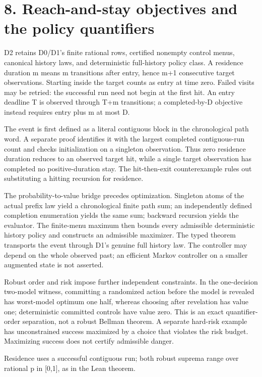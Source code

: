 \documentclass[11pt,a4paper]{article}
\newcommand{\companionEquation}[1]{\begin{center}\sbox{\companionEqBox}{$\displaystyle #1$}\ifdim\wd\companionEqBox>\linewidth\resizebox{\linewidth}{!}{\usebox{\companionEqBox}}\else\usebox{\companionEqBox}\fi\end{center}}
\begin{document}
\section{8. Reach-and-stay objectives and the policy quantifiers}
D2 retains D0/D1's finite rational rows, certified nonempty control menus, canonical history laws, and deterministic full-history policy class. A residence duration m means m transitions after entry, hence m+1 consecutive target observations. Starting inside the target counts as entry at time zero. Failed visits may be retried: the successful run need not begin at the first hit. An entry deadline T is observed through T+m transitions; a completed-by-D objective instead requires entry plus m at most D.

The event is first defined as a literal contiguous block in the chronological path word. A separate proof identifies it with the largest completed contiguous-run count and checks initialization on a singleton observation. Thus zero residence duration reduces to an observed target hit, while a single target observation has completed no positive-duration stay. The hit-then-exit counterexample rules out substituting a hitting recursion for residence.

The probability-to-value bridge precedes optimization. Singleton atoms of the actual prefix law yield a chronological finite path sum; an independently defined completion enumeration yields the same sum; backward recursion yields the evaluator. The finite-menu maximum then bounds every admissible deterministic history policy and constructs an admissible maximizer. The typed theorem transports the event through D1's genuine full history law. The controller may depend on the whole observed past; an efficient Markov controller on a smaller augmented state is not asserted.

Robust order and risk impose further independent constraints. In the one-decision two-model witness, committing a randomized action before the model is revealed has worst-model optimum one half, whereas choosing after revelation has value one; deterministic committed controls have value zero. This is an exact quantifier-order separation, not a robust Bellman theorem. A separate hard-risk example has unconstrained success maximized by a choice that violates the risk budget. Maximizing success does not certify admissible danger.

\companionEquation{\{\exists e\leq T:\ \forall j\leq m,\ Y_{e+j}\in G\},\qquad \sup_{p\in\mathbb{Q}\cap[0,1]}\min(p,1-p)=\frac{1}{2}<1=\min_{\theta}\sup_{p\in\mathbb{Q}\cap[0,1]} V(\theta,p).}
{\small Residence uses a successful contiguous run; both robust suprema range over rational p in [0,1], as in the Lean theorem.}
\end{document}

